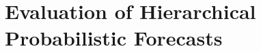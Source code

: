 \documentclass[11pt]{article}
\theoremstyle{definition}
\begin{document}
%
%
%

\section{Evaluation of Hierarchical Probabilistic Forecasts} \label{sec:evaluation}
\end{document}
